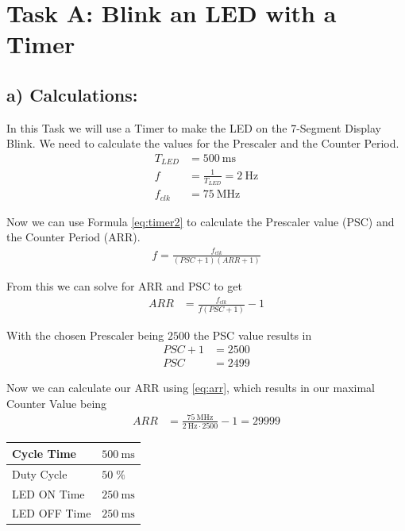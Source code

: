 \section{Task A: Blink an LED with a Timer}\label{tsk:task_a}

\subsection{a) Calculations:}
In this Task we will use a Timer to make the LED on the 7-Segment Display Blink. We need to calculate the values for the Prescaler and the Counter Period.
\begin{align}
	T_{LED} &= \SI{500}{\milli\second} \\
	f &= \frac{1}{T_{LED}} = \SI{2}{\hertz} \\
	f_{clk} &= \SI{75}{\mega\hertz}
\end{align}

Now we can use Formula \ref{eq:timer2} to calculate the Prescaler value (PSC) and the Counter Period (ARR).
\begin{align}\label{eq:timer2}
	f = \frac{f_{clk}}{(PSC + 1)(ARR + 1)}
\end{align}

From this we can solve for ARR and PSC to get
\begin{align}\label{eq:arr}
	ARR &= \frac{f_{clk}}{f(PSC + 1)} - 1
\end{align}

With the chosen Prescaler being $2500$ the PSC value results in 
\begin{align}
	PSC + 1 &= 2500 \\
	PSC &= 2499
\end{align}

Now we can calculate our ARR using \ref{eq:arr}, which results in our maximal Counter Value being 
\begin{align}
	ARR &= \frac{\SI{75}{\mega\hertz}}{\SI{2}{\hertz} \cdot \num{2500}} - 1 = \num{29999}
\end{align}

\begin{table}[h]
    \begin{tabularx}{0.6\textwidth}{|X|X|}
        \hline
        Cycle Time & $\SI{500}{\milli \second}$\\ \hline
        Duty Cycle & $50 \; \%$\\ \hline
        LED ON Time & $\SI{250}{\milli \second}$\\ \hline
        LED OFF Time & $\SI{250}{\milli \second}$\\ \hline
    \end{tabularx}
\end{table}

